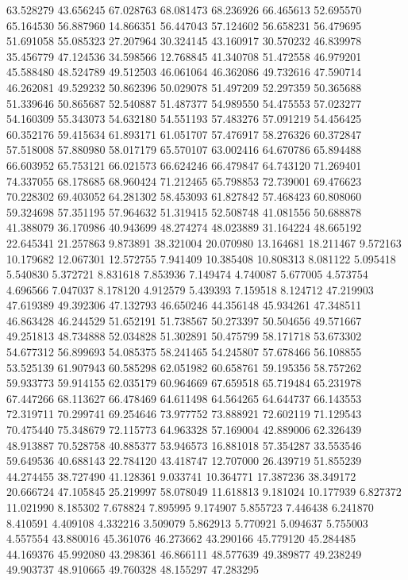 63.528279
43.656245
67.028763
68.081473
68.236926
66.465613
52.695570
65.164530
56.887960
14.866351
56.447043
57.124602
56.658231
56.479695
51.691058
55.085323
27.207964
30.324145
43.160917
30.570232
46.839978
35.456779
47.124536
34.598566
12.768845
41.340708
51.472558
46.979201
45.588480
48.524789
49.512503
46.061064
46.362086
49.732616
47.590714
46.262081
49.529232
50.862396
50.029078
51.497209
52.297359
50.365688
51.339646
50.865687
52.540887
51.487377
54.989550
54.475553
57.023277
54.160309
55.343073
54.632180
54.551193
57.483276
57.091219
54.456425
60.352176
59.415634
61.893171
61.051707
57.476917
58.276326
60.372847
57.518008
57.880980
58.017179
65.570107
63.002416
64.670786
65.894488
66.603952
65.753121
66.021573
66.624246
66.479847
64.743120
71.269401
74.337055
68.178685
68.960424
71.212465
65.798853
72.739001
69.476623
70.228302
69.403052
64.281302
58.453093
61.827842
57.468423
60.808060
59.324698
57.351195
57.964632
51.319415
52.508748
41.081556
50.688878
41.388079
36.170986
40.943699
48.274274
48.023889
31.164224
48.665192
22.645341
21.257863
9.873891
38.321004
20.070980
13.164681
18.211467
9.572163
10.179682
12.067301
12.572755
7.941409
10.385408
10.808313
8.081122
5.095418
5.540830
5.372721
8.831618
7.853936
7.149474
4.740087
5.677005
4.573754
4.696566
7.047037
8.178120
4.912579
5.439393
7.159518
8.124712
47.219903
47.619389
49.392306
47.132793
46.650246
44.356148
45.934261
47.348511
46.863428
46.244529
51.652191
51.738567
50.273397
50.504656
49.571667
49.251813
48.734888
52.034828
51.302891
50.475799
58.171718
53.673302
54.677312
56.899693
54.085375
58.241465
54.245807
57.678466
56.108855
53.525139
61.907943
60.585298
62.051982
60.658761
59.195356
58.757262
59.933773
59.914155
62.035179
60.964669
67.659518
65.719484
65.231978
67.447266
68.113627
66.478469
64.611498
64.564265
64.644737
66.143553
72.319711
70.299741
69.254646
73.977752
73.888921
72.602119
71.129543
70.475440
75.348679
72.115773
64.963328
57.169004
42.889006
62.326439
48.913887
70.528758
40.885377
53.946573
16.881018
57.354287
33.553546
59.649536
40.688143
22.784120
43.418747
12.707000
26.439719
51.855239
44.274455
38.727490
41.128361
9.033741
10.364771
17.387236
38.349172
20.666724
47.105845
25.219997
58.078049
11.618813
9.181024
10.177939
6.827372
11.021990
8.185302
7.678824
7.895995
9.174907
5.855723
7.446438
6.241870
8.410591
4.409108
4.332216
3.509079
5.862913
5.770921
5.094637
5.755003
4.557554
43.880016
45.361076
46.273662
43.290166
45.779120
45.284485
44.169376
45.992080
43.298361
46.866111
48.577639
49.389877
49.238249
49.903737
48.910665
49.760328
48.155297
47.283295
